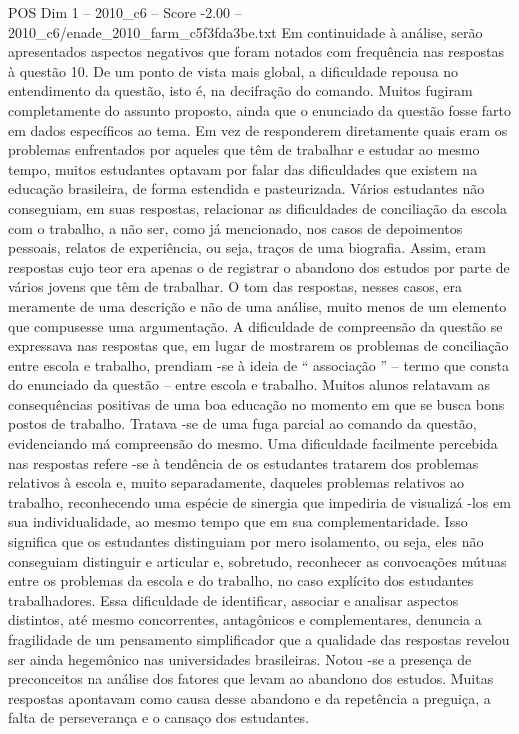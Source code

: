 \begin{textsample}{POS Dim 1 – 2010\_c6 – Score -2.00 – 2010\_c6/enade\_2010\_farm\_c5f3fda3be.txt}
Em continuidade à análise, serão apresentados aspectos negativos que foram notados com frequência nas respostas à questão 10.
De um ponto de vista mais global, a dificuldade repousa no entendimento da questão, isto é, na decifração do comando.
Muitos fugiram completamente do assunto proposto, ainda que o enunciado da questão fosse farto em dados específicos ao tema.
Em vez de responderem diretamente quais eram os problemas enfrentados por aqueles que têm de trabalhar e estudar ao mesmo tempo, muitos estudantes optavam por falar das dificuldades que existem na educação brasileira, de forma estendida e pasteurizada.
Vários estudantes não conseguiam, em suas respostas, relacionar as dificuldades de conciliação da escola com o trabalho, a não ser, como já mencionado, nos casos de depoimentos pessoais, relatos de experiência, ou seja, traços de uma biografia.
Assim, eram respostas cujo teor era apenas o de registrar o abandono dos estudos por parte de vários jovens que têm de trabalhar.
O tom das respostas, nesses casos, era meramente de uma descrição e não de uma análise, muito menos de um elemento que compusesse uma argumentação.
A dificuldade de compreensão da questão se expressava nas respostas que, em lugar de mostrarem os problemas de conciliação entre escola e trabalho, prendiam -se à ideia de “ associação ” – termo que consta do enunciado da questão – entre escola e trabalho.
Muitos alunos relatavam as consequências positivas de uma boa educação no momento em que se busca bons postos de trabalho.
Tratava -se de uma fuga parcial ao comando da questão, evidenciando má compreensão do mesmo.
Uma dificuldade facilmente percebida nas respostas refere -se à tendência de os estudantes tratarem dos problemas relativos à escola e, muito separadamente, daqueles problemas relativos ao trabalho, reconhecendo uma espécie de sinergia que impediria de visualizá -los em sua individualidade, ao mesmo tempo que em sua complementaridade.
Isso significa que os estudantes distinguiam por mero isolamento, ou seja, eles não conseguiam distinguir e articular e, sobretudo, reconhecer as convocações mútuas entre os problemas da escola e do trabalho, no caso explícito dos estudantes trabalhadores.
Essa dificuldade de identificar, associar e analisar aspectos distintos, até mesmo concorrentes, antagônicos e complementares, denuncia a fragilidade de um pensamento simplificador que a qualidade das respostas revelou ser ainda hegemônico nas universidades brasileiras.
Notou -se a presença de preconceitos na análise dos fatores que levam ao abandono dos estudos.
Muitas respostas apontavam como causa desse abandono e da repetência a preguiça, a falta de perseverança e o cansaço dos estudantes.

\end{textsample}
